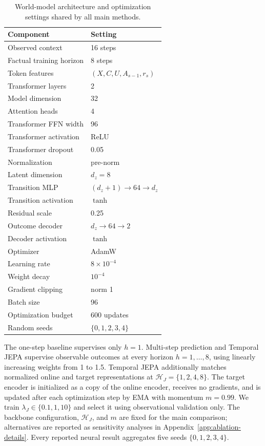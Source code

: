 \begin{table}[t]
\centering
\caption{World-model architecture and optimization settings shared by
all main methods.}
\label{tab:architecture-hyperparameters}
\small
\setlength{\tabcolsep}{4pt}
\begin{tabular}{ll}
\toprule
Component & Setting \\
\midrule
Observed context & 16 steps \\
Factual training horizon & 8 steps \\
Token features & $(X,C,U,A_{s-1},r_s)$ \\
Transformer layers & 2 \\
Model dimension & 32 \\
Attention heads & 4 \\
Transformer FFN width & 96 \\
Transformer activation & ReLU \\
Transformer dropout & 0.05 \\
Normalization & pre-norm \\
Latent dimension & $d_z=8$ \\
Transition MLP & $(d_z+1)\rightarrow64\rightarrow d_z$ \\
Transition activation & $\tanh$ \\
Residual scale & 0.25 \\
Outcome decoder & $d_z\rightarrow64\rightarrow2$ \\
Decoder activation & $\tanh$ \\
Optimizer & AdamW \\
Learning rate & $8\times10^{-4}$ \\
Weight decay & $10^{-4}$ \\
Gradient clipping & norm 1 \\
Batch size & 96 \\
Optimization budget & 600 updates \\
Random seeds & $\{0,1,2,3,4\}$ \\
\bottomrule
\end{tabular}
\end{table}

The one-step baseline supervises only $h=1$. Multi-step prediction and
Temporal JEPA supervise observable outcomes at every horizon
$h=1,\ldots,8$, using linearly increasing weights from 1 to 1.5.
Temporal JEPA additionally matches normalized online and target
representations at $\mathcal H_J=\{1,2,4,8\}$. The target encoder is
initialized as a copy of the online encoder, receives no gradients, and
is updated after each optimization step by EMA with momentum $m=0.99$.
We train $\lambda_J\in\{0.1,1,10\}$ and select it using observational
validation only. The backbone configuration, $\mathcal H_J$, and $m$
are fixed for the main comparison; alternatives are reported as
sensitivity analyses in Appendix~\ref{app:ablation-details}. Every
reported neural result aggregates five seeds $\{0,1,2,3,4\}$.


